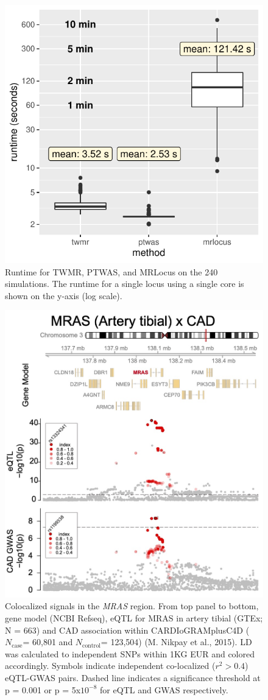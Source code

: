\documentclass[11pt]{article}
\newcommand{\Ncase}{$N_{\textrm{case}}$\xspace}
\newcommand{\Ncontrol}{$N_{\textrm{control}}$\xspace}
\begin{document}
\begin{figure}[!ht]
  \centering
  \includegraphics[width=.7\textwidth]{figs/runtime}
  \caption{Runtime for TWMR, PTWAS, and MRLocus on the 240
    simulations. The runtime for a single locus using a single core is
    shown on the y-axis (log scale).}
\end{figure}

\begin{figure}[!ht]
  \centering
  \includegraphics[width=.7\textwidth]{figs/region_mras.jpg}
  \caption{Colocalized signals in the \emph{MRAS} region. From top panel to
    bottom, gene model (NCBI Refseq), eQTL for MRAS in artery tibial
    (GTEx; N = 663) and CAD association within CARDIoGRAMplusC4D
    (\Ncase = 60,801 and \Ncontrol = 123,504) (M. Nikpay et al.,
    2015). LD was calculated to independent SNPs within 1KG EUR and
    colored accordingly. Symbols indicate independent co-localized
    ($r^2 > 0.4$) eQTL-GWAS pairs. Dashed line indicates a significance
    threshold at p = 0.001 or p = 5x$10^{-8}$ for eQTL and GWAS
    respectively.}
\end{figure}
\end{document}
